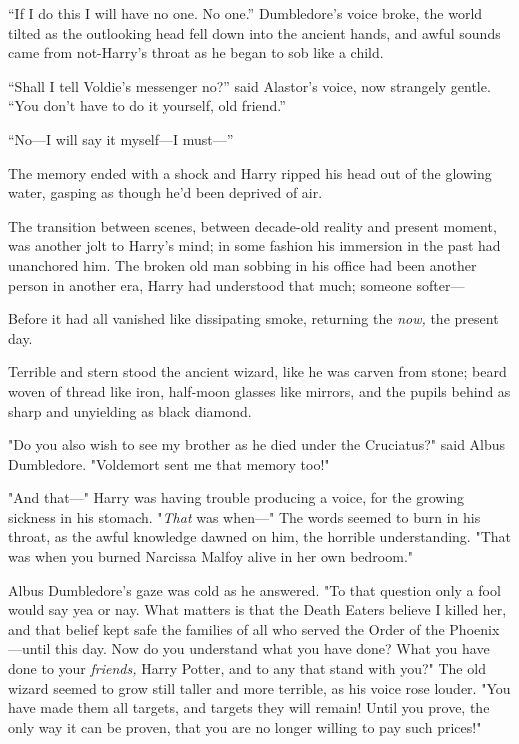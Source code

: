 \begin{em}
``If I do this I will have no one. No one.'' Dumbledore's voice broke, the
world tilted as the outlooking head fell down into the ancient hands, and awful
sounds came from not-Harry's throat as he began to sob like a child.

``Shall I tell Voldie's messenger no?'' said Alastor's voice, now strangely
gentle. ``You don't have to do it yourself, old friend.''

``No---I will say it myself---I must---''
\end{em}
\later
The memory ended with a shock and Harry ripped his head out of the glowing
water, gasping as though he'd been deprived of air.

The transition between scenes, between decade-old reality and present moment,
was another jolt to Harry's mind; in some fashion his immersion in the past had
unanchored him. The broken old man sobbing in his office had been another
person in another era, Harry had understood that much; someone softer---

Before it had all vanished like dissipating smoke, returning the \emph{now,}
the present day.

Terrible and stern stood the ancient wizard, like he was carven from stone;
beard woven of thread like iron, half-moon glasses like mirrors, and the pupils
behind as sharp and unyielding as black diamond.

"Do you also wish to see my brother as he died under the Cruciatus?" said Albus
Dumbledore. "Voldemort sent me that memory too!"

"And that---" Harry was having trouble producing a voice, for the growing
sickness in his stomach. "\emph{That} was when---" The words seemed to burn in
his throat, as the awful knowledge dawned on him, the horrible understanding.
"That was when you burned Narcissa Malfoy alive in her own bedroom."

Albus Dumbledore's gaze was cold as he answered. "To that question only a fool
would say yea or nay. What matters is that the Death Eaters believe I killed
her, and that belief kept safe the families of all who served the Order of the
Phoenix---until this day. Now do you understand what you have done? What you
have done to your \emph{friends,} Harry Potter, and to any that stand with
you?" The old wizard seemed to grow still taller and more terrible, as his
voice rose louder. "You have made them all targets, and targets they will
remain! Until you prove, the only way it can be proven, that you are no longer
willing to pay such prices!"


